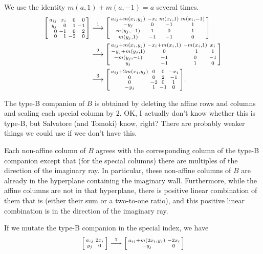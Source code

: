 \documentclass{amsart}
\theoremstyle{definition}
\theoremstyle{remark}
\numberwithin{equation}{section}
\newcommand{\0}{{\mathbf{0}}}
\begin{document}
We use the identity $m(a,1)+m(a,-1)=a$ several times.
\begin{align*}
\begin{bsmallmatrix*}[r]
a_{ij}&x_i&0&0\\
y_j&0&1&-1\\
0&-1&0&2\\
0&1&-2&0
\end{bsmallmatrix*}
&\overset{1}{\longrightarrow}
\begin{bsmallmatrix*}
a_{ij}+m(x_i,y_j)&-x_i&m(x_i,1)&m(x_i,-1)\\
-y_j&0&-1&1\\
m(y_j,-1)&1&0&1\\
m(y_j,1)&-1&-1&0
\end{bsmallmatrix*}\\
&\overset{2}{\longrightarrow}
\begin{bsmallmatrix*}
a_{ij}+m(x_i,y_j)&-x_i+m(x_i,1)&-m(x_i,1)&x_i\\
-y_j+m(y_j,1)&0&\,\,\,1&1\\
-m(y_j,-1)&-1&0&-1\\
y_j&-1&1&0
\end{bsmallmatrix*}\\
&\overset{3}{\longrightarrow}
\begin{bsmallmatrix*}
a_{ij}+2m(x_i,y_j)&0&0&-x_i\\
0&0&2&-1\\
0&-2&0&1\\
-y_j&1&-1&0
\end{bsmallmatrix*}.
\end{align*}

The type-B companion of $B$ is obtained by deleting the affine rows and columns and scaling each special column by $2$.
OK, I actually don't know whether this is type-B, but Salvatore (and Tomoki) know, right?
There are probably weaker things we could use if wee don't have this.

Each non-affine column of $B$ agrees with the corresponding column of the type-B companion except that (for the special columns) there are multiples of the direction of the imaginary ray.
In particular, these non-affine columns of $B$ are already in the hyperplane containing the imaginary wall.  Furthermore, while the affine columns are not in that hyperplane, there is positive linear combination of them that is (either their sum or a two-to-one ratio), and this positive linear combination is in the direction of the imaginary ray.

If we mutate the type-B companion in the special index, we have
\[
\begin{bsmallmatrix*}
a_{ij}&2x_i\\
y_j&0
\end{bsmallmatrix*}
\overset{1}{\longrightarrow}
\begin{bsmallmatrix*}
a_{ij}+m(2x_i,y_j)&-2x_i\\
-y_j&0
\end{bsmallmatrix*}
\]
\end{document}
